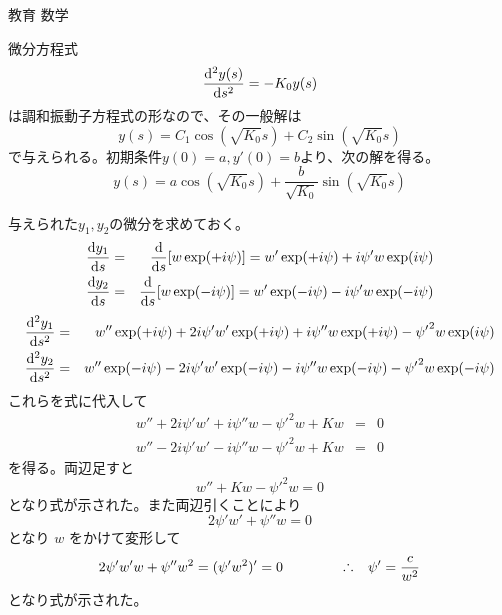 \documentclass[fleqn]{jbook}
\begin{document}
\begin{answer}{教育 数学}{}
\begin{subanswers}
\begin{subsubanswers}
  \end{subsubanswers}

  
\SubAnswer

  \begin{subsubanswers}
  \SubSubAnswer
    微分方程式
%
    \[ {\frac{{\rm d} ^{2}y(s)}{{\rm d} s^{2}}} = -K_{0}y(s) \]
%
    は調和振動子方程式の形なので、その一般解は
%
    \[ y(s) = C_{1}\cos (\sqrt{K_{0}}s) + C_{2}\sin (\sqrt{K_{0}}s) \]
%
    で与えられる。初期条件$y(0)=a, y'(0)=b$より、次の解を得る。
%
    \[ y(s) = a\cos (\sqrt{K_{0}}s) + \frac{b}{\sqrt{K_{0}}}\sin (\sqrt{K_{0}}s) \]
%


  \SubSubAnswer
    与えられた$y_1,y_2$の微分を求めておく。
%
    \begin{eqnarray*}
      \Deriver{y_{1}}{s} &=& \Deriver{}{s}[w\exp (+i\psi)]%
                         = w'\exp (+i\psi) + i\psi' w\exp (i\psi)\\
      \Deriver{y_{2}}{s} &=& \Deriver{}{s}[w\exp (-i\psi)]%
                         = w'\exp (-i\psi) - i\psi' w\exp (-i\psi)
    \end{eqnarray*}
    \begin{eqnarray*}
      \Deriver{^{2}y_{1}}{s^{2}}%
        &=& w''\exp (+i\psi) + 2i\psi'w'\exp (+i\psi)%
             +i\psi''w\exp (+i\psi)-{\psi'}^{2}w\exp (i\psi)\\
      \Deriver{^{2}y_{2}}{s^{2}}%
        &=& w''\exp (-i\psi) - 2i\psi'w'\exp (-i\psi)%
             -i\psi''w\exp (-i\psi)-{\psi'}^{2}w\exp (-i\psi)
    \end{eqnarray*}
%
    これらを式に代入して
%
    \begin{eqnarray*}
      w'' + 2i\psi' w' + i\psi'' w - {\psi'}^{2}w + Kw &=& 0\\
      w'' - 2i\psi' w' - i\psi'' w - {\psi'}^{2}w + Kw &=& 0
    \end{eqnarray*}
%
    を得る。両辺足すと
%
    \[ w'' + Kw - {\psi'}^{2}w = 0 \]
%
    となり式が示された。また両辺引くことにより
%
    \[ 2\psi' w' + \psi'' w = 0 \]
%
    となり $w$ をかけて変形して
%
    \[ 2\psi' w' w + \psi'' w^{2} = (\psi' w^{2})' = 0 \hspace{15mm}%
       \Yueni \psi' = \frac{c}{w^{2}} \]
%
    となり式が示された。



\end{subsubanswers}
\end{subanswers}
\end{answer}
\end{document}
